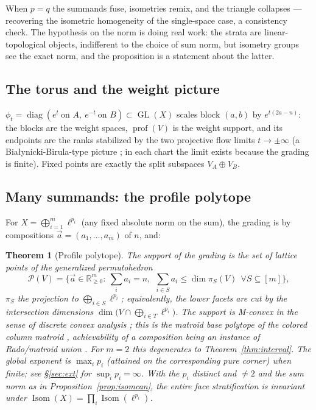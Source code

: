 \documentclass[11pt]{amsart}
\newtheorem{theorem}{Theorem}[section]
\theoremstyle{definition}
\newcommand{\R}{\mathbb{R}}
\newcommand{\prof}{\operatorname{prof}}
\newcommand{\Isom}{\operatorname{Isom}}
\newcommand{\GL}{\operatorname{GL}}
\begin{document}
When $p=q$ the summands fuse, isometries remix, and the triangle collapses --- recovering the isometric homogeneity of the single-space case, a consistency check. The hypothesis on the norm is doing real work: the strata are linear-topological objects, indifferent to the choice of sum norm, but isometry groups see the exact norm, and the proposition is a statement about the latter.

\subsection{The torus and the weight picture}

$\phi_t=\operatorname{diag}(e^t\ \text{on }A,\ e^{-t}\ \text{on }B)\subset\GL(X)$ scales block $(a,b)$ by $e^{t(2a-n)}$: the blocks are the weight spaces, $\prof(V)$ is the weight support, and its endpoints are the ranks stabilized by the two projective flow limits $t\to\pm\infty$ (a Bia\l ynicki-Birula-type picture \cite{BB}; in each chart the limit exists because the grading is finite). Fixed points are exactly the split subspaces $V_A\oplus V_B$.

\subsection{Many summands: the profile polytope}

For $X=\bigoplus_{i=1}^m\ell^{p_i}$ (any fixed absolute norm on the sum), the grading is by compositions $\vec a=(a_1,\dots,a_m)$ of $n$, and:

\begin{theorem}[Profile polytope]\label{thm:polytope}
The support of the grading is the set of lattice points of the generalized permutohedron
\[
\mathcal P(V)=\Big\{\vec a\in\R_{\ge0}^m:\ \sum_i a_i=n,\ \ \sum_{i\in S}a_i\le\dim\pi_S(V)\ \ \forall S\subseteq[m]\Big\},
\]
$\pi_S$ the projection to $\bigoplus_{i\in S}\ell^{p_i}$; equivalently, the lower facets are cut by the intersection dimensions $\dim\big(V\cap\bigoplus_{i\in T}\ell^{p_i}\big)$. The support is M-convex in the sense of discrete convex analysis \cite{Murota}; this is the matroid base polytope of the colored column matroid \cite{GGMS}, achievability of a composition being an instance of Rado/matroid union \cite{Oxley}. For $m=2$ this degenerates to Theorem~\ref{thm:interval}. The global exponent is $\max_i p_i$ \textup{(}attained on the corresponding pure corner\textup{)} when finite; see \S\ref{sec:ext} for $\sup_ip_i=\infty$. With the $p_i$ distinct and $\ne2$ and the sum norm as in Proposition~\ref{prop:isomcan}, the entire face stratification is invariant under $\Isom(X)=\prod_i\Isom(\ell^{p_i})$.
\end{theorem}
\end{document}
